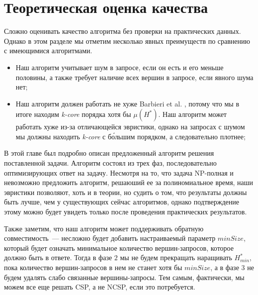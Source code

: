 \section{Теоретическая оценка качества}

Сложно оценивать качество алгоритма без проверки на практических данных. Однако в этом разделе мы отметим несколько явных преимуществ по сравнению с имеющимися алгоритмами.

\begin{itemize}
  \item Наш алгоритм учитывает шум в запросе, если он есть и его меньше половины, а также требует наличие всех вершин в запросе, если явного шума нет;
  \item Наш алгоритм должен работать не хуже Barbieri et al. \cite{Barbieri15}, потому что мы в итоге находим \textit{k-core} порядка хотя бы $\mu(H^*)$. Наш алгоритм может работать хуже из-за отличающейся эвристики, однако на запросах с шумом мы должны находить \textit{k-core} с б\'{о}льшим порядком, а следовательно плотнее;
\end{itemize}

\chapterconclusion

В этой главе был подробно описан предложенный алгоритм решения поставленной задачи. Алгоритм состоял из трех фаз, последовательно оптимизирующих ответ на задачу. Несмотря на то, что задача NP-полная и невозможно предложить алгоритм, решаюший ее за полиномиальное время, наши эвристики позволяют, хоть и в теории, но судить о том, что результаты должны быть лучше, чем у существующих сейчас алгоритмов, однако подтверждение этому можно будет увидеть только после проведения практических результатов.

Также заметим, что наш алгоритм может поддерживать обратную совместимость~--- несложно будет добавить настраиваемый параметр $minSize$, который будет означать минимальное количество вершин-запросов, которое должно быть в ответе. Тогда в фазе $2$ мы не будем прекращать наращивать $H_{min}^*$, пока количество вершин-запросов в нем не станет хотя бы $minSize$, а в фазе $3$ не будем удалять слабо связанные вершины-запросы. Тем самым, фактически, мы можем все еще решать CSP, а не NCSP, если это потребуется.
